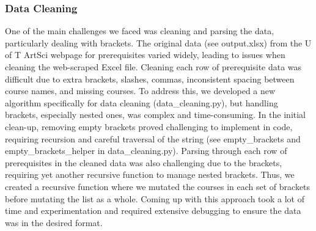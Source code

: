 \documentclass[fontsize=11pt]{article}
\begin{document}
\subsubsection{Data Cleaning}
One of the main challenges we faced was cleaning and parsing the data, particularly dealing with brackets. The original data  (see output.xlsx) from the U of T ArtSci webpage for prerequisites varied widely, leading to issues when cleaning the web-scraped Excel file. Cleaning each row of prerequisite data was difficult due to extra brackets, slashes, commas, inconsistent spacing between course names, and missing courses. To address this, we developed a new algorithm specifically for data cleaning (data\_cleaning.py), but handling brackets, especially nested ones, was complex and time-consuming. In the initial clean-up, removing empty brackets proved challenging to implement in code, requiring recursion and careful traversal of the string (see empty\_brackets and empty\_brackets\_helper in data\_cleaning.py). Parsing through each row of prerequisites in the cleaned data was also challenging due to the brackets, requiring yet another recursive function to manage nested brackets. Thus, we created a recursive function where we mutated the courses in each set of brackets before mutating the list as a whole. Coming up with this approach took a lot of time and experimentation and required extensive debugging to ensure the data was in the desired format.
\end{document}
